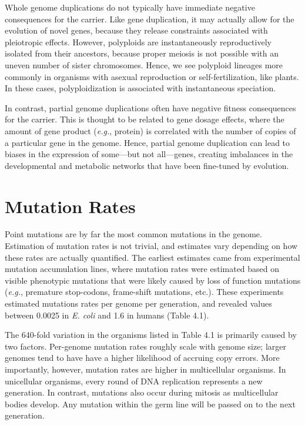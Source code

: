 \documentclass[
]{book}
\begin{document}
Whole genome duplications do not typically have immediate negative consequences for the carrier. Like gene duplication, it may actually allow for the evolution of novel genes, because they release constraints associated with pleiotropic effects. However, polyploids are instantaneously reproductively isolated from their ancestors, because proper meiosis is not possible with an uneven number of sister chromosomes. Hence, we see polyploid lineages more commonly in organisms with asexual reproduction or self-fertilization, like plants. In these cases, polyploidization is associated with instantaneous speciation.

In contrast, partial genome duplications often have negative fitness consequences for the carrier. This is thought to be related to gene dosage effects, where the amount of gene product (\emph{e.g.}, protein) is correlated with the number of copies of a particular gene in the genome. Hence, partial genome duplication can lead to biases in the expression of some---but not all---genes, creating imbalances in the developmental and metabolic networks that have been fine-tuned by evolution.

\hypertarget{mutation-rates}{%
\section{Mutation Rates}\label{mutation-rates}}

Point mutations are by far the most common mutations in the genome. Estimation of mutation rates is not trivial, and estimates vary depending on how these rates are actually quantified. The earliest estimates came from experimental mutation accumulation lines, where mutation rates were estimated based on visible phenotypic mutations that were likely caused by loss of function mutations (\emph{e.g.}, premature stop-codons, frame-shift mutations, etc.). These experiments estimated mutations rates per genome per generation, and revealed values between 0.0025 in \emph{E. coli} and 1.6 in humans (Table 4.1).

The 640-fold variation in the organisms listed in Table 4.1 is primarily caused by two factors. Per-genome mutation rates roughly scale with genome size; larger genomes tend to have have a higher likelihood of accruing copy errors. More importantly, however, mutation rates are higher in multicellular organisms. In unicellular organisms, every round of DNA replication represents a new generation. In contrast, mutations also occur during mitosis as multicellular bodies develop. Any mutation within the germ line will be passed on to the next generation.
\end{document}
